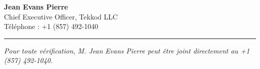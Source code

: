 \documentclass[11pt,a4paper]{article}
\begin{document}
\vspace{16pt}
\singlespacing

\begin{flushleft}
\textbf{Jean Evans Pierre}\\
Chief Executive Officer, Tekkod LLC\\
Téléphone : +1 (857) 492-1040\\
\end{flushleft}

\vspace{10pt}
\hrule
\vspace{6pt}
{\footnotesize\itshape Pour toute vérification, M. Jean Evans Pierre peut être joint directement
au +1 (857) 492-1040.}
\end{document}

